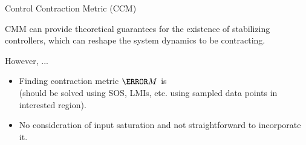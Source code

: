 \begin{frame}{\insertsubsectionhead}{Control Contraction Metric (CCM)}

  CMM can provide theoretical guarantees for the existence of stabilizing controllers, which can reshape the system dynamics to be contracting.

  \vspace{2em}

  However, ...
  \begin{itemize}
    \item Finding contraction metric $\mm{M}$ is  
    \\
    (should be solved using SOS, LMIs, etc. using sampled data points in interested region).

    \item No consideration of input saturation and not straightforward to incorporate it.
  \end{itemize}

\end{frame}

